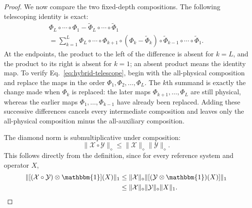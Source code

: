 \documentclass[aps,floatfix,10pt,amssymb,amsmath,superscriptaddress,nofootinbib,longbibliography,nobalancelastpage,twocolumn]{revtex4-2}
\newcommand{\id}{\mathbbm{1}}
\begin{document}
\begin{proof}
We now compare the two fixed-depth compositions.  The following telescoping identity is exact:
\begin{multline}
 \Phi_L\circ\cdots\circ\Phi_1
 -\widetilde\Phi_L\circ\cdots\circ\widetilde\Phi_1\\
 =\sum_{k=1}^L
 \Phi_L\circ\cdots\circ\Phi_{k+1}
 \circ(\Phi_k-\widetilde\Phi_k)
 \circ\widetilde\Phi_{k-1}\circ\cdots
 \circ\widetilde\Phi_1.
 \label{eq:hybrid-telescope}
\end{multline}
At the endpoints, the product to the left of the difference is absent for $k=L$, and the product to its right is absent for $k=1$; an absent product means the identity map.  To verify Eq.~\eqref{eq:hybrid-telescope}, begin with the all-physical composition and replace the maps in the order $\Phi_1,\Phi_2,\ldots,\Phi_L$.  The $k$th summand is exactly the change made when $\Phi_k$ is replaced: the later maps $\Phi_{k+1},\ldots,\Phi_L$ are still physical, whereas the earlier maps $\Phi_1,\ldots,\Phi_{k-1}$ have already been replaced.  Adding these successive differences cancels every intermediate composition and leaves only the all-physical composition minus the all-auxiliary composition.

The diamond norm is submultiplicative under composition:
\begin{equation}
 \|\mathcal X\circ\mathcal Y\|_\diamond
 \leq\|\mathcal X\|_\diamond\|\mathcal Y\|_\diamond.
 \label{eq:diamond-submultiplicative}
\end{equation}
This follows directly from the definition, since for every reference system and operator $X$,
\begin{align}
 \|[(\mathcal X\circ\mathcal Y)\otimes\id](X)\|_1
 &\leq\|\mathcal X\|_\diamond
 \|[(\mathcal Y\otimes\id)(X)]\|_1\nonumber\\
 &\leq\|\mathcal X\|_\diamond\|\mathcal Y\|_\diamond
 \|X\|_1.
\end{align}


\end{proof}
\end{document}
